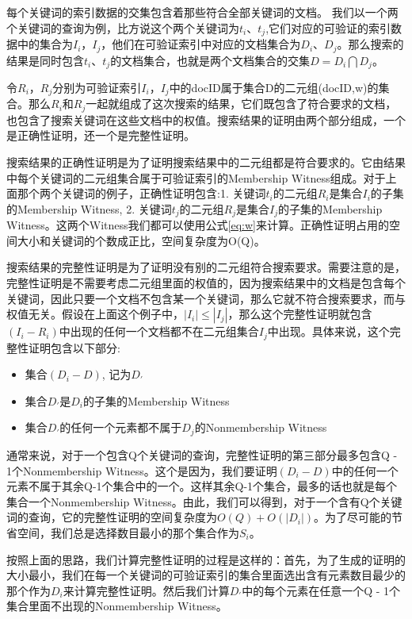 每个关键词的索引数据的交集包含着那些符合全部关键词的文档。
我们以一个两个关键词的查询为例，比方说这个两个关键词为$t_i$、$t_j$,它们对应的可验证的索引数据中的集合为$I_i$，$I_j$，他们在可验证索引中对应的文档集合为$D_i$、$D_j$。那么搜索的结果是同时包含$t_i$、$t_j$的文档集合，也就是两个文档集合的交集$D = D_i \bigcap D_j$。

令$R_i$，$R_j$分别为可验证索引$I_i$，$I_j$中的docID属于集合D的二元组(docID,w)的集合。那么$R_i$和$R_j$一起就组成了这次搜索的结果，它们既包含了符合要求的文档，也包含了搜索关键词在这些文档中的权值。搜索结果的证明由两个部分组成，一个是正确性证明，还一个是完整性证明。

搜索结果的正确性证明是为了证明搜索结果中的二元组都是符合要求的。它由结果中每个关键词的二元组集合属于可验证索引的Membership Witness组成。对于上面那个两个关键词的例子，正确性证明包含:1. 关键词$t_i$的二元组$R_i$是集合$I_i$的子集的Membership Witness, 2. 关键词$t_j$的二元组$R_j$是集合$I_j$的子集的Membership Witness。这两个Witness我们都可以使用公式\ref{eq:w}来计算。正确性证明占用的空间大小和关键词的个数成正比，空间复杂度为O(Q)。

搜索结果的完整性证明是为了证明没有别的二元组符合搜索要求。需要注意的是，完整性证明是不需要考虑二元组里面的权值的，因为搜索结果中的文档是包含每个关键词，因此只要一个文档不包含某一个关键词，那么它就不符合搜索要求，而与权值无关。假设在上面这个例子中，$|I_i| \le |I_j|$，那么这个完整性证明就包含$(I_i - R_i)$中出现的任何一个文档都不在二元组集合$I_j$中出现。具体来说，这个完整性证明包含以下部分:
\begin{itemize}
\item 集合$(D_i - D)$, 记为$D_\prime$
\item 集合$D_\prime$是$D_i$的子集的Membership Witness
\item 集合$D_\prime$的任何一个元素都不属于$D_j$的Nonmembership Witness
\end{itemize}

通常来说，对于一个包含Q个关键词的查询，完整性证明的第三部分最多包含Q - 1个Nonmembership Witness。这个是因为，我们要证明$(D_i - D)$中的任何一个元素不属于其余Q-1个集合中的一个。这样其余Q-1个集合，最多的话也就是每个集合一个Nonmembership Witness。由此，我们可以得到，对于一个含有Q个关键词的查询，它的完整性证明的空间复杂度为$O(Q) + O(|D_i|)$。为了尽可能的节省空间，我们总是选择数目最小的那个集合作为$S_i$。

按照上面的思路，我们计算完整性证明的过程是这样的：首先，为了生成的证明的大小最小，我们在每一个关键词的可验证索引的集合里面选出含有元素数目最少的那个作为$D_i$来计算完整性证明。然后我们计算$D_\prime$中的每个元素在任意一个Q - 1个集合里面不出现的Nonmembership Witness。

